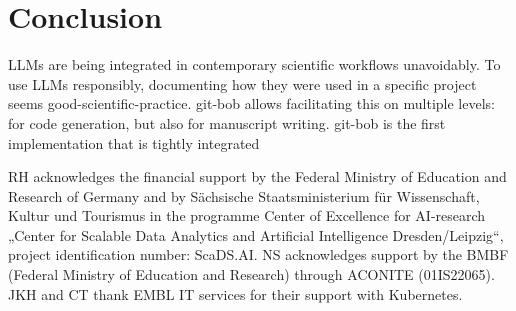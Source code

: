 \documentclass{ecai}
\begin{document}

\section{Conclusion}

LLMs are being integrated in contemporary scientific workflows unavoidably. 
To use LLMs responsibly, documenting how they were used in a specific project seems good-scientific-practice. git-bob allows facilitating this on multiple levels: for code generation, but also for manuscript writing. git-bob is the first implementation that is tightly integrated




\begin{ack}
RH acknowledges the financial support by the Federal Ministry of Education and Research of Germany and by Sächsische Staatsministerium für Wissenschaft, Kultur und Tourismus in the programme Center of Excellence for AI-research „Center for Scalable Data Analytics and Artificial Intelligence Dresden/Leipzig“, project identification number: ScaDS.AI.
NS acknowledges support by the BMBF (Federal Ministry of Education and Research) through ACONITE (01IS22065).
JKH and CT thank EMBL IT services for their support with Kubernetes.

\end{ack}




\end{document}
